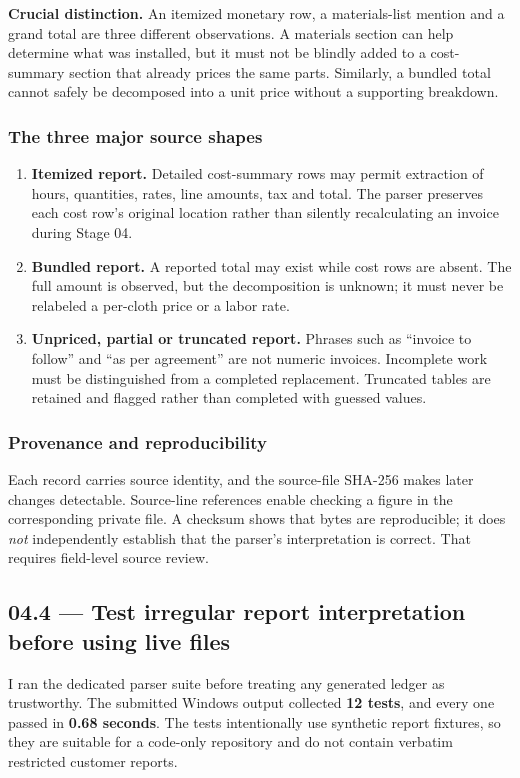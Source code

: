 \documentclass[11pt,a4paper]{article}
\DeclareRobustCommand{\code}[1]{{\ttfamily\small\detokenize{#1}}}
\begin{document}
\textbf{Crucial distinction.} An itemized monetary row, a materials-list mention and a grand total are three different observations. A materials section can help determine what was installed, but it must not be blindly added to a cost-summary section that already prices the same parts. Similarly, a bundled total cannot safely be decomposed into a unit price without a supporting breakdown.

\subsubsection{The three major source shapes}
\begin{enumerate}
\item \textbf{Itemized report.} Detailed cost-summary rows may permit extraction of hours, quantities, rates, line amounts, tax and total. The parser preserves each cost row's original location rather than silently recalculating an invoice during Stage 04.
\item \textbf{Bundled report.} A reported total may exist while cost rows are absent. The full amount is observed, but the decomposition is unknown; it must never be relabeled a per-cloth price or a labor rate.
\item \textbf{Unpriced, partial or truncated report.} Phrases such as ``invoice to follow'' and ``as per agreement'' are not numeric invoices. Incomplete work must be distinguished from a completed replacement. Truncated tables are retained and flagged rather than completed with guessed values.
\end{enumerate}

\subsubsection{Provenance and reproducibility}
Each record carries source identity, and the source-file SHA-256 makes later changes detectable. Source-line references enable checking a figure in the corresponding private \code{FSR-####.txt} file. A checksum shows that bytes are reproducible; it does \emph{not} independently establish that the parser's interpretation is correct. That requires field-level source review.

\subsection{04.4 --- Test irregular report interpretation before using live files}
I ran the dedicated parser suite before treating any generated ledger as trustworthy. The submitted Windows output collected \textbf{12 tests}, and every one passed in \textbf{0.68 seconds}. The tests intentionally use synthetic report fixtures, so they are suitable for a code-only repository and do not contain verbatim restricted customer reports.
\end{document}
